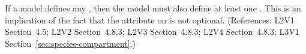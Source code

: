 If a model defines any \Species, then the model must also define at least
one \Compartment.  This is an implication of the fact that the
 attribute on \Species is not optional.  (References: L2V1
Section~4.5; L2V2 Section~4.8.3; L2V3 Section~4.8.3; L2V4 Section~4.8.3; 
L3V1 Section~\ref{sec:species-compartment}.)

